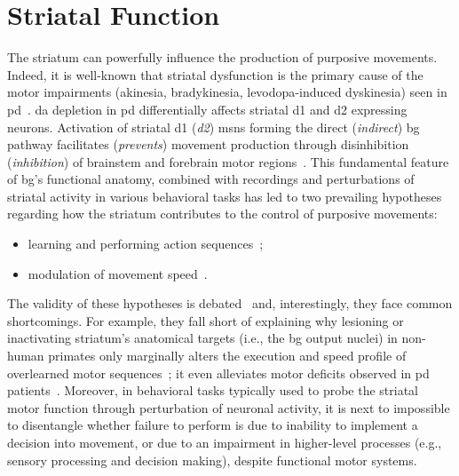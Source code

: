 \section{Striatal Function}
\label{ch:disscusion:lesion}

The striatum can powerfully influence the production of purposive movements.
Indeed, it is well-known that striatal dysfunction is the primary cause of the motor impairments (akinesia, bradykinesia, levodopa-induced dyskinesia) seen in \gls{pd}~\cite{Mink1996,Hornykiewicz2006,McGregor2019Neuron}.
\Gls{da} depletion in \gls{pd} differentially affects striatal \gls{d1} and \gls{d2} expressing neurons.
Activation of striatal \gls{d1} (\textit{\gls{d2}}) \glspl{msn} forming the direct (\textit{indirect}) \gls{bg} pathway facilitates (\textit{prevents}) movement production through disinhibition (\textit{inhibition}) of brainstem and forebrain motor regions~\cite{Kravitz2010Nature}.
This fundamental feature of \gls{bg}'s functional anatomy, combined with recordings and perturbations of striatal activity in various behavioral tasks has led to two prevailing hypotheses regarding how the striatum contributes to the control of purposive movements: %
\begin{itemize}[noitemsep]
    \item learning and performing action sequences\footnotemark~\cite{Barnes2005Nature, Jin2010N, Cui2013Nature, Klaus2017Neuron, Markowitz2018Cell, Dhawale2019};
    \item  modulation of movement speed~\cite{Kim2014EJN, Rueda2015NN, Barbera2016Neuron, Yttri2016Nature, Panigrahi2015Cell}.
\end{itemize}
The validity of these hypotheses is debated~\cite[for instance, see][]{Dudman2016CurrOpinNeurobiol} and, interestingly, they face common shortcomings.
For example, they fall short of explaining why lesioning or inactivating striatum's anatomical targets (i.e., the \gls{bg} output nuclei) in non-human primates only marginally alters the execution and speed profile of overlearned motor sequences~\cite{Desmurget2010JNeurosci}; it even alleviates motor deficits observed in \gls{pd} patients~\cite{Turner2010CurrOpinNeurobiol}.
Moreover, in behavioral tasks typically used to probe the striatal motor function through perturbation of neuronal activity, it is next to impossible to disentangle whether failure to perform is due to inability to implement a decision into movement, or due to an impairment in higher-level processes (e.g., sensory processing and decision making), despite functional motor systems.\footnotemark
